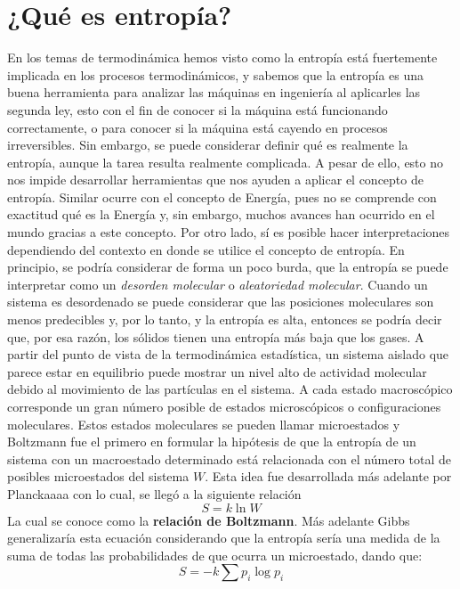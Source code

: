 \section{¿Qué es entropía?}
En los temas de termodinámica hemos visto como la entropía está fuertemente implicada en los procesos termodinámicos, y sabemos que la entropía es una buena herramienta para analizar las máquinas en ingeniería al aplicarles las segunda ley, esto con el fin de conocer si la máquina está funcionando correctamente, o para conocer si la máquina está cayendo en procesos irreversibles. Sin embargo, se puede considerar definir qué es realmente la entropía, aunque la tarea resulta realmente complicada. A pesar de ello, esto no nos impide desarrollar herramientas que nos ayuden a aplicar el concepto de entropía. Similar ocurre con el concepto de Energía, pues no se comprende con exactitud qué es la Energía y, sin embargo, muchos avances han ocurrido en el mundo gracias a este concepto. Por otro lado, sí es posible hacer interpretaciones dependiendo del contexto en donde se utilice el concepto de entropía. En principio, se podría considerar de forma un poco burda, que la entropía se puede interpretar como un \emph{desorden molecular} o \emph{aleatoriedad molecular}. Cuando un sistema es desordenado se puede considerar que las posiciones moleculares son menos predecibles y, por lo tanto, y la entropía es alta, entonces se podría decir que, por esa razón, los sólidos tienen una entropía más baja que los gases.
A partir del punto de vista de la termodinámica estadística, un sistema aislado que parece estar en equilibrio puede mostrar un nivel alto de actividad molecular debido al movimiento de las partículas en el sistema. A cada estado macroscópico corresponde un gran número posible de estados microscópicos o configuraciones moleculares. Estos estados moleculares se pueden llamar microestados y Boltzmann fue el primero en formular la hipótesis de que la entropía de un sistema con un macroestado determinado está relacionada con el número total de posibles microestados del sistema $W$. Esta idea fue desarrollada más adelante por Planckaaaa con lo cual, se llegó a la siguiente relación
\begin{equation}
    S = k\ln W
\end{equation}
La cual se conoce como la \textbf{relación de Boltzmann}. 
Más adelante Gibbs generalizaría esta ecuación considerando que la entropía sería una medida de la suma de todas las probabilidades de que ocurra un microestado, dando que:
\begin{equation}
    S = -k \sum p_i \log p_i
\end{equation}

